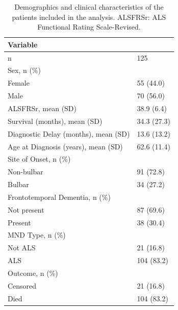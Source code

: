 \begin{table}
\centering
\caption{Demographics and clinical characteristics of the patients included in the analysis. ALSFRSr: ALS Functional Rating Scale-Revised.}
\label{tab:coxdemographics}
\begin{tabular}{|ll|}
\hline
              \textbf{Variable}                          &      \\
\hline
 n                               & 125         \\\hline
 Sex, n (\%)          & \\
 \hspace{5mm}Female & 55 (44.0)   \\
\hspace{5mm}Male & 70 (56.0)   \\\hline
 ALSFRSr, mean (SD)                 & 38.9 (6.4)  \\\hline
 Survival (months), mean (SD)         & 34.3 (27.3) \\\hline
 Diagnostic Delay (months), mean (SD)  & 13.6 (13.2) \\\hline
 Age at Diagnosis (years), mean (SD)  & 62.6 (11.4) \\\hline
 Site of Onset, n (\%)        &  \\
 \hspace{5mm}Non-bulbar   & 91 (72.8)   \\
 \hspace{5mm}Bulbar  & 34 (27.2)   \\\hline
 Frontotemporal Dementia, n (\%)       & \\
 \hspace{5mm}Not present & 87 (69.6)   \\
\hspace{5mm}Present & 38 (30.4)   \\\hline
 MND Type, n (\%)                & \\
 \hspace{5mm}Not ALS   & 21 (16.8)   \\
 \hspace{5mm}ALS   & 104 (83.2)  \\\hline
 Outcome, n (\%)                          & \\
 \hspace{5mm}Censored   & 21 (16.8)   \\
\hspace{5mm}Died   & 104 (83.2)  \\\hline

\end{tabular}
\end{table}

